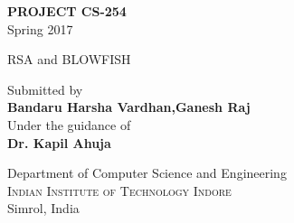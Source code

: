\documentclass[12pt,a4paper]{report}
\begin{document}
\renewcommand\bibname{References} %

\begin{titlepage}


\begin{center}
\vspace*{1.2cm}



\Huge \textbf{PROJECT CS-254}\\[0.25in]
\Large{\textup{Spring 2017}} 

        \vspace{.5in}

\LARGE{RSA and BLOWFISH}

        \vspace{.5in}


\Large{Submitted by} \\
\textbf{Bandaru Harsha Vardhan,Ganesh Raj}
\vspace{.6in}\\

Under the guidance of\\
{\textbf{Dr. Kapil Ahuja}}\\[0.2in]

\vspace{1in}

\LARGE{Department of Computer Science and Engineering}\\
\large
\textsc{Indian Institute of Technology Indore}\\
Simrol, India \\
\vspace{0.5in}

\end{center}

\end{titlepage}



\newpage

\begingroup
\renewcommand{\cleardoublepage}{}
\renewcommand{\clearpage}{}
\end{document}
